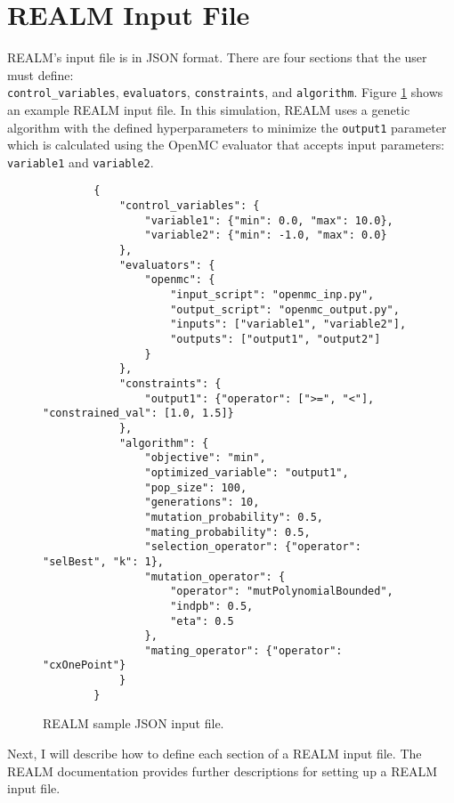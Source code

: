 \section{REALM Input File}
REALM's input file is in JSON format. 
There are four sections that the user must define: \\ \texttt{control\_variables}, 
\texttt{evaluators}, \texttt{constraints}, and \texttt{algorithm}. 
Figure \ref{fig:realm-input} shows an example \gls{REALM} input file. 
In this simulation, \gls{REALM} uses a genetic algorithm with the defined 
hyperparameters to minimize the \texttt{output1} parameter which is 
calculated using the OpenMC evaluator that accepts input parameters: 
\texttt{variable1} and \texttt{variable2}. 
\begin{figure}[]
    \begin{verbatim}
        {
            "control_variables": {
                "variable1": {"min": 0.0, "max": 10.0}, 
                "variable2": {"min": -1.0, "max": 0.0}
            }, 
            "evaluators": {
                "openmc": {
                    "input_script": "openmc_inp.py",
                    "output_script": "openmc_output.py", 
                    "inputs": ["variable1", "variable2"],
                    "outputs": ["output1", "output2"]
                }
            }, 
            "constraints": {
                "output1": {"operator": [">=", "<"], "constrained_val": [1.0, 1.5]}
            }, 
            "algorithm": {
                "objective": "min", 
                "optimized_variable": "output1", 
                "pop_size": 100, 
                "generations": 10, 
                "mutation_probability": 0.5,
                "mating_probability": 0.5,
                "selection_operator": {"operator": "selBest", "k": 1},
                "mutation_operator": {
                    "operator": "mutPolynomialBounded",
                    "indpb": 0.5,
                    "eta": 0.5
                },
                "mating_operator": {"operator": "cxOnePoint"}
            }
        }
    \end{verbatim}
    \caption{\acrfull{REALM} sample JSON input file.}
    \label{fig:realm-input}
\end{figure}

Next, I will describe how to define each section of a \gls{REALM} input file. 
The \gls{REALM} documentation \cite{chee_arfcrealm_2021} provides further 
descriptions for setting up a \gls{REALM} input file.

